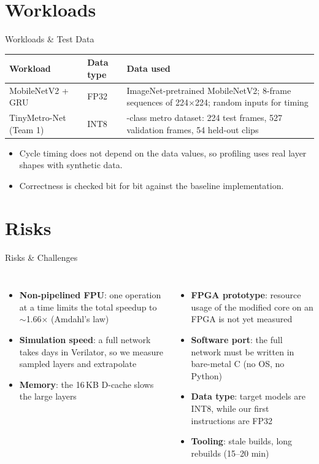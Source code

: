 \documentclass[aspectratio=169,11pt]{beamer}
\begin{document}
\section{Workloads}
\begin{frame}{Workloads \& Test Data}
  \small
  \begin{tabular}{@{}>{\raggedright\arraybackslash}p{3.3cm}>{\raggedright\arraybackslash}p{2.0cm}>{\raggedright\arraybackslash}p{8.2cm}@{}}\toprule
    Workload & Data type & Data used\\\midrule
    MobileNetV2 + GRU & FP32 & ImageNet-pretrained MobileNetV2; 8-frame
      sequences of 224$\times$224; random inputs for timing\\
    TinyMetro-Net (Team 1) & INT8 & 8-class metro dataset: 224 test frames,
      527 validation frames, 54 held-out clips\\\bottomrule
  \end{tabular}
  \vspace{3mm}
  \begin{itemize}
    \item Cycle timing does not depend on the data values, so profiling uses
          real layer shapes with synthetic data.
    \item Correctness is checked bit for bit against the baseline implementation.
  \end{itemize}
\end{frame}

\section{Risks}
\begin{frame}{Risks \& Challenges}
  \begin{columns}[T]
    \begin{itemize}\small
      \item \textbf{Non-pipelined FPU}: one operation at a time limits the total
            speedup to $\sim$1.66$\times$ (Amdahl's law)
      \item \textbf{Simulation speed}: a full network takes days in Verilator,
            so we measure sampled layers and extrapolate
      \item \textbf{Memory}: the 16\,KB D-cache slows the large layers
    \end{itemize}
    \begin{itemize}\small
      \item \textbf{FPGA prototype}: resource usage of the modified core on an
            FPGA is not yet measured
      \item \textbf{Software port}: the full network must be written in
            bare-metal C (no OS, no Python)
      \item \textbf{Data type}: target models are INT8, while our first
            instructions are FP32
      \item \textbf{Tooling}: stale builds, long rebuilds (15--20 min)
    \end{itemize}
  \end{columns}
\end{frame}
\end{document}
